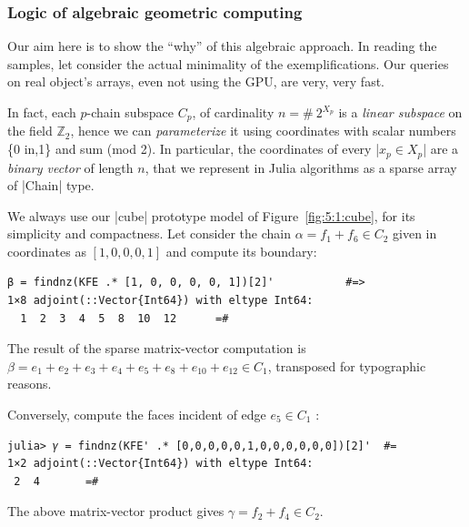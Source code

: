 \begin{coding}[Algebraic computation of FE = $\delta_1$]
\subsubsection*{Logic of algebraic geometric computing}\label{sect:5-2-3}

Our aim here is to show the “why” of this algebraic approach. In reading the samples, let consider the actual minimality of the exemplifications. Our queries on real object’s arrays, even not using the GPU, are very, very fast.

In fact, each $p$-chain subspace $C_p$, of cardinality $n = \#\ {2}^{X_p}$ is a \emph{linear subspace} on the field $\mathbb{Z}_2$, hence we can \emph{parameterize} it using coordinates with scalar numbers \{0 in,1\} and sum (mod 2).
In particular, the coordinates of every |$x_p \in X_p$| are a \emph{binary vector} of length $n$, that we represent in Julia algorithms as a sparse array of |Chain| type.

\begin{coding} We always use our |cube| prototype model of Figure~\ref{fig:5:1:cube}, for its simplicity and compactness. Let consider the chain 
$α = f_1+f_6 \in C_2$ given in coordinates as $[1,0,0,0,1]$ and compute its boundary:
\begin{lstlisting}[language=JuliaLocal, style=julia, mathescape=true]
β = findnz(KFE .* [1, 0, 0, 0, 0, 1])[2]'			#=>
1×8 adjoint(::Vector{Int64}) with eltype Int64:
  1  2  3  4  5  8  10  12		=#
\end{lstlisting}
The result of the sparse matrix-vector computation is $\beta = e_1+ e_2+ e_3+ e_4+ e_5+ e_8+ e_{10}+ e_{12} \in C_1$, transposed for typographic reasons.
\end{coding}

\begin{coding} Conversely, compute the faces incident of edge $e_5 \in C_1$ :
\begin{lstlisting}[language=JuliaLocal, style=julia, mathescape=true]
julia> 𝛾 = findnz(KFE' .* [0,0,0,0,0,1,0,0,0,0,0,0])[2]'  #=
1×2 adjoint(::Vector{Int64}) with eltype Int64:
 2  4		=#
\end{lstlisting}
The above matrix-vector product gives $\gamma = f_2+ f_4 \in C_2$.
\end{coding}



\end{coding}
